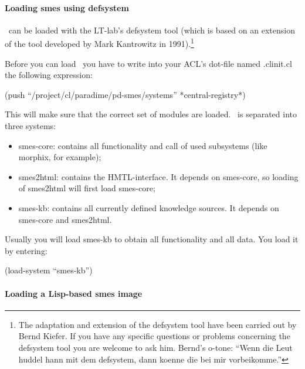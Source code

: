\paragraph{Loading {\sc smes} using {\sc defsystem}}

\smes\ can be loaded with the LT-lab's {\sc defsystem} tool
(which is based on an extension of the tool
developed by Mark Kantrowitz in 1991).\footnote{The adaptation and
extension of the {\sc defsystem} tool have been carried out by Bernd
Kiefer. If you have any specific questions or problems concerning the 
{\sc defsystem} tool you are welcome to ask him. Bernd's o-tone:
``Wenn die Leut huddel hann mit dem defsystem, 
dann koenne die bei mir vorbeikomme.''}

Before you can load \smes\ you have to write into your ACL's dot-file
named {\sc .clinit.cl} the following expression:

\begin{center}
(push ``/project/cl/paradime/pd-smes/systems'' *central-registry*)
\end{center}

\noindent This will make sure that the correct set of modules are loaded.
\smes\ is separated into three systems:
\begin{itemize}
\item   {\sc smes-core}: contains all functionality and call
        of used subsystems (like {\sc morphix}, for example);

\item   {\sc smes2html}: contains the HMTL-interface. It depends
        on {\sc smes-core}, so loading of {\sc smes2html} will first
        load {\sc smes-core};

\item   {\sc smes-kb}: contains all currently defined knowledge
        sources. It depends on {\sc smes-core} and {\sc smes2html}.
        
\end{itemize}

Usually you will load {\sc smes-kb} to obtain all functionality and all
data. You load it by entering:

\begin{center}

{\sc (load-system ``smes-kb'')}
\end{center}


\paragraph{Loading a Lisp-based {\sc smes} image}

